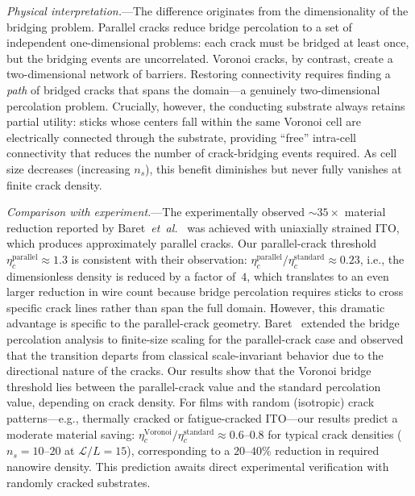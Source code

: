 \textit{Physical interpretation.}---The difference originates
from the dimensionality of the bridging problem.
Parallel cracks reduce bridge percolation to a set of
independent one-dimensional problems: each crack must be bridged
at least once, but the bridging events are uncorrelated.
Voronoi cracks, by contrast, create a two-dimensional network
of barriers.
Restoring connectivity requires finding a \emph{path} of bridged
cracks that spans the domain---a genuinely two-dimensional
percolation problem.
Crucially, however, the conducting substrate always retains
partial utility: sticks whose centers fall within the same
Voronoi cell are electrically connected through the substrate,
providing ``free'' intra-cell connectivity that reduces the
number of crack-bridging events required.
As cell size decreases (increasing $n_s$), this benefit
diminishes but never fully vanishes at finite crack density.

\textit{Comparison with experiment.}---The
experimentally observed $\sim 35\times$ material reduction
reported by Baret~\textit{et~al.}~\cite{Baret2024} was achieved
with uniaxially strained ITO, which produces approximately
parallel cracks.
Our parallel-crack threshold
$\eta_c^\mathrm{parallel} \approx 1.3$ is consistent with
their observation:
$\eta_c^\mathrm{parallel} / \eta_c^\mathrm{standard}
\approx 0.23$, i.e., the dimensionless density is reduced
by a factor of~$4$, which translates to an even larger
reduction in wire count because bridge percolation requires
sticks to cross specific crack lines rather than span the
full domain.
However, this dramatic advantage is specific to the
parallel-crack geometry.
Baret~\cite{Baret2025} extended the bridge percolation analysis
to finite-size scaling for the parallel-crack case and observed
that the transition departs from classical scale-invariant
behavior due to the directional nature of the cracks.
Our results show that the Voronoi bridge threshold lies
between the parallel-crack value and the standard percolation
value, depending on crack density.
For films with random (isotropic) crack patterns---e.g.,
thermally cracked or fatigue-cracked ITO---our results
predict a moderate material saving:
$\eta_c^\mathrm{Voronoi} / \eta_c^\mathrm{standard}
\approx 0.6$--$0.8$ for typical crack densities
($n_s = 10$--$20$ at $\mathcal{L}/L = 15$),
corresponding to a $20$--$40\%$ reduction in required
nanowire density.
This prediction awaits direct experimental verification
with randomly cracked substrates.

